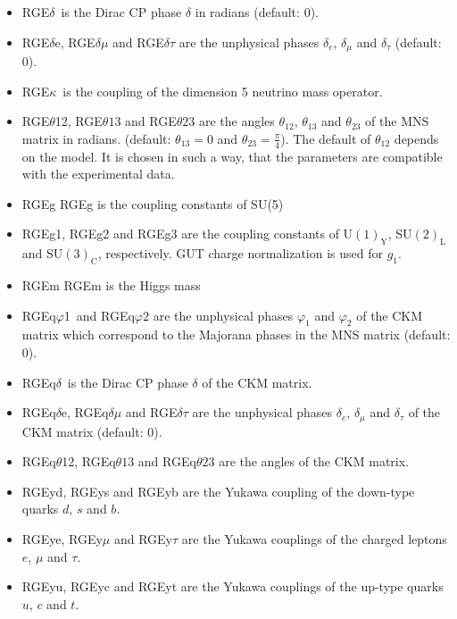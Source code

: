 \documentclass[10pt,a4paper,twoside]{scrartcl}
\begin{document}
\begin{itemize}
\item RGE$\delta$\ is the Dirac CP phase $\delta$ in radians (default: $0$).
\item RGE$\delta$e, RGE$\delta\mu$ and RGE$\delta\tau$ are the unphysical phases $\delta_e$,
  $\delta_\mu$ and $\delta_\tau$ (default: $0$). 
\item RGE$\kappa$\ is the coupling of the dimension 5 neutrino mass operator.
  
\item RGE$\theta$12, RGE$\theta13$ and RGE$\theta23$ are the angles $\theta_{12}$, $\theta_{13}$
and $\theta_{23}$ of the MNS matrix in radians. (default: $\theta_{13}=0$ and
$\theta_{23}=\frac{\pi}{4}$). The default of $\theta_{12}$ depends on the
model. It is chosen in such a way, that the parameters are compatible with the
experimental data. 
\item RGEg RGEg is the coupling constants of SU(5)
  
\item RGEg1, RGEg2 and RGEg3 are the coupling constants of U$(1)_\mathrm{Y}$,
  SU$(2)_\mathrm{L}$ and SU$(3)_\mathrm{C}$, respectively.  GUT charge
  normalization is used for $g_1$.
  
\item RGEm RGEm is the Higgs mass
  
\item RGEq$\varphi$1\ and RGEq$\varphi2$ are the unphysical phases $\varphi_1$ and $\varphi_2$ of the
 CKM matrix which correspond to the Majorana phases in the MNS matrix (default: $0$).
\item RGEq$\delta$\ is the Dirac CP phase $\delta$ of the CKM matrix.
\item RGEq$\delta$e, RGEq$\delta\mu$ and RGE$\delta\tau$ are the unphysical phases $\delta_e$,
$\delta_\mu$ and $\delta_\tau$ of the CKM matrix (default: $0$).
\item RGEq$\theta$12, RGEq$\theta13$ and RGEq$\theta23$ are the angles of the CKM matrix. 
\item RGEyd, RGEys and RGEyb are the Yukawa coupling of the down-type quarks $d$,
  $s$ and $b$.
\item RGEye, RGEy$\mu$ and RGEy$\tau$ are the Yukawa couplings of the charged
  leptons $e$, $\mu$ and $\tau$.
\item RGEyu, RGEyc and RGEyt are the Yukawa couplings of the up-type quarks $u$,
  $c$ and $t$.

\end{itemize}
\end{document}
